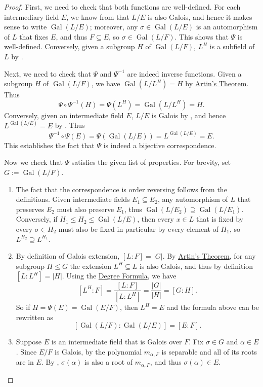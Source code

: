 \documentclass[12pt]{report}
\numberwithin{equation}{section}
\numberwithin{theorem}{chapter}
\theoremstyle{definition}
\newtheorem*{basic properties}{Basic Properties}
\newtheorem*{Important Remark}{Important Remark}
\DeclareMathOperator{\Gal}{Gal}
\begin{document}
\begin{proof}
First, we need to check that both functions are well-defined. For each intermediary field $E$, we know from  that $L/E$ is also Galois, and hence it makes sense to write $\Gal(L/E)$; moreover, any $\sigma \in \Gal(L/E)$ is an automorphism of $L$ that fixes $E$, and thus $F \subseteq E$, so $\sigma \in \Gal(L/F)$. This shows that $\Psi$ is well-defined. Conversely, given a subgroup $H$ of $\Gal(L/F)$, $L^H$ is a subfield of $L$ by .


Next, we need to check that $\Psi$ and $\Psi^{-1}$ are indeed inverse functions. Given a subgroup $H$ of $\Gal(L/F)$, we have $\Gal(L/L^H) = H$ by \hyperref[Artin's theorem]{Artin's Theorem}. Thus
$$\Psi \circ \Psi^{-1}(H) = \Psi(L^H) = \Gal(L/L^H) = H.$$
Conversely, given an intermediate field $E$, $L/E$ is Galois by , and hence $L^{\Gal(L/E)} = E$ by . Thus
$$\Psi^{-1} \circ \Psi(E) = \Psi(\Gal(L/E)) = L^{\Gal(L/E)} = E.$$
This establishes the fact that $\Psi$ is indeed a bijective correspondence.


Now we check that $\Psi$ satisfies the given list of properties. For brevity, set $G := \Gal(L/F)$.

\begin{enumerate}[leftmargin=20pt,label=(\alph*)]
\item The fact that the correspondence is order reversing follows from the definitions. Given intermediate fields $E_1 \subseteq E_2$, any automorphism of $L$ that preserves $E_2$ must also preserve $E_1$, thus $\Gal(L/E_2) \supseteq \Gal(L/E_1)$. Conversely, if $H_1 \leq H_2 \leq \Gal(L/E)$, then every $x \in L$ that is fixed by every $\sigma \in H_2$ must also be fixed in particular by every element of $H_1$, so $L^{H_2} \supseteq L^{H_1}$.

\item By definition of Galois extension, $[L:F] = |G|$. By \hyperref[Artin's theorem]{Artin's Theorem}, for any subgroup $H \leq G$ the extension $L^H \subseteq L$ is also Galois, and thus by definition $[L:L^H] = |H|$. Using the \hyperref[deg formula]{Degree Formula}, we have
$$[L^H:F] = \frac{[L:F]}{[L:L^H]} = \frac{|G|}{|H|} = [G:H].$$
So if $H = \Psi(E) = \Gal(E/F)$, then $L^H = E$ and the formula above can be rewritten as
$$[\Gal(L/F) : \Gal(L/E)] = [E:F].$$

\item Suppose $E$ is an intermediate field that is Galois over $F$. Fix $\sigma \in G$ and $\alpha \in E$. Since $E/F$ is Galois, by  the polynomial $m_{\alpha,F}$ is separable and all of its roots are in $E$. By , $\sigma(\alpha)$ is also a root of $m_{\alpha,F}$, and thus $\sigma(\alpha) \in E$. 
 

\end{enumerate}
\end{proof}
\end{document}
